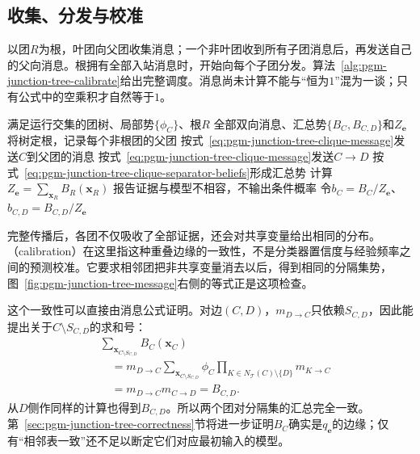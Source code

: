 \subsection{收集、分发与校准}
\label{sec:pgm-junction-tree-calibration}

以团$R$为根，叶团向父团收集消息；一个非叶团收到所有子团消息后，再发送自己的父向消息。根拥有全部入站消息时，开始向每个子团分发。算法~\ref{alg:pgm-junction-tree-calibrate}给出完整调度。消息尚未计算不能与“恒为$1$”混为一谈；只有公式中的空乘积才自然等于$1$。

\begin{algorithm}[团树上的和积校准]
  \label{alg:pgm-junction-tree-calibrate}
  \begin{algorithmic}[1]
    \Require 满足运行交集的团树、局部势$\{\phi_C\}$、根$R$
    \Ensure 全部双向消息、汇总势$\{B_C,B_{C,D}\}$和$Z_{\bm{e}}$
    \State 将树定根，记录每个非根团的父团
      \State 按式~\eqref{eq:pgm-junction-tree-clique-message}发送$C$到父团的消息
    \EndFor
        \State 按式~\eqref{eq:pgm-junction-tree-clique-message}发送$C\to D$
      \EndFor
    \EndFor
    \State 按式~\eqref{eq:pgm-junction-tree-clique-separator-beliefs}形成汇总势
    \State 计算$Z_{\bm{e}}=\sum_{\bm{x}_R}B_R(\bm{x}_R)$
      \State 报告证据与模型不相容，不输出条件概率
    \Else
      \State 令$b_C=B_C/Z_{\bm{e}}$、$b_{C,D}=B_{C,D}/Z_{\bm{e}}$
    \EndIf
  \end{algorithmic}
\end{algorithm}

完整传播后，各团不仅吸收了全部证据，还会对共享变量给出相同的分布。（calibration）在这里指这种重叠边缘的一致性，不是分类器置信度与经验频率之间的预测校准。它要求相邻团把非共享变量消去以后，得到相同的分隔集势，图~\ref{fig:pgm-junction-tree-message}右侧的等式正是这项检查。

这个一致性可以直接由消息公式证明。对边$(C,D)$，$m_{D\to C}$只依赖$S_{C,D}$，因此能提出关于$C\setminus S_{C,D}$的求和号：
\begin{equation}
  \begin{aligned}
    &\sum_{\bm{x}_{C\setminus S_{C,D}}}B_C(\bm{x}_C)\\
      &\quad=m_{D\to C}
        \sum_{\bm{x}_{C\setminus S_{C,D}}}
          \phi_C\prod_{K\in N_{\mathcal{T}}(C)\setminus\{D\}}m_{K\to C}\\
      &\quad=m_{D\to C}m_{C\to D}=B_{C,D}.
  \end{aligned}
  \label{eq:pgm-junction-tree-local-calibration}
\end{equation}
从$D$侧作同样的计算也得到$B_{C,D}$。所以两个团对分隔集的汇总完全一致。第~\ref{sec:pgm-junction-tree-correctness}节将进一步证明$B_C$确实是$q_{\bm{e}}$的边缘；仅有“相邻表一致”还不足以断定它们对应最初输入的模型。

